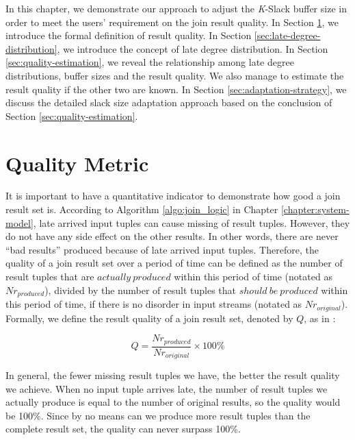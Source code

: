 \documentclass[a4paper, 11pt, twoside]{report}
\begin{document}
In this chapter, we demonstrate our approach to adjust the \textit{K}-Slack buffer size in order to meet the users' requirement on the join result quality. In Section \ref{sec:quality-metric}, we introduce the formal definition of result quality. In Section \ref{sec:late-degree-distribution}, we introduce the concept of late degree distribution. In Section \ref{sec:quality-estimation}, we reveal the relationship among late degree distributions, buffer sizes and the result quality. We also manage to estimate the result quality if the other two are known. In Section \ref{sec:adaptation-strategy}, we discuss the detailed slack size adaptation approach based on the conclusion of Section \ref{sec:quality-estimation}.

\section{Quality Metric}
\label{sec:quality-metric}
It is important to have a quantitative indicator to demonstrate how good a join result set is. According to Algorithm \ref{algo:join_logic} in Chapter \ref{chapter:system-model}, late arrived input tuples can cause missing of result tuples. However, they do not have any side effect on the other results. In other words, there are never ``bad results'' produced because of late arrived input tuples. Therefore, the quality of a join result set over a period of time can be defined as the number of result tuples that are $actually\ produced$ within this period of time (notated as $Nr_{produced}$), divided by the number of result tuples that $should\ be\ produced$ within this period of time, if there is no disorder in input streams (notated as $Nr_{original}$). Formally, we define the result quality of a join result set, denoted by $Q$, as in \cite{wu2007window}:

\begin{equation}
\label{eq:quality}
Q = \frac{Nr_{produced}}{Nr_{original}}\times 100\%
\end{equation}

%

%
%

In general, the fewer missing result tuples we have, the better the result quality we achieve. When no input tuple arrives late, the number of result tuples we actually produce is equal to the number of original results, so the quality would be 100\%. Since by no means can we produce more result tuples than the complete result set, the quality can never surpass 100\%.
\end{document}
